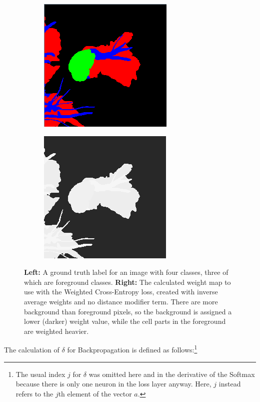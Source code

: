 \begin {figure}[!ht]
	\begin{center}
	\begin {subfigure}[b]{0.3\linewidth}
		\includegraphics{img/fig_weights_normal.png}
	\end {subfigure}\hspace{2.5cm}
	\begin {subfigure}[b]{0.3\linewidth}
		\includegraphics{img/fig_weights_weightmap.png}
	\end {subfigure}
	\end{center}

		\caption[The Cross-Entropy Loss weight map.]{\textbf{Left:} A ground truth label for an image with four classes, three of which are foreground classes. \textbf{Right:} The calculated weight map to use with the Weighted Cross-Entropy loss, created with inverse average weights and no distance modifier term. There are more background than foreground pixels, so the background is assigned a lower (darker) weight value, while the cell parts in the foreground are weighted heavier.}
		\label{fig:weight_map}

\end {figure}

\noindent The calculation of $\delta$ for Backpropagation is defined as follows:\footnote{The usual index $j$ for $\delta$ was omitted here and in the derivative of the Softmax because there is only one neuron in the loss layer anyway. Here, $j$ instead refers to the $j$th element of the vector $a$.} \\


